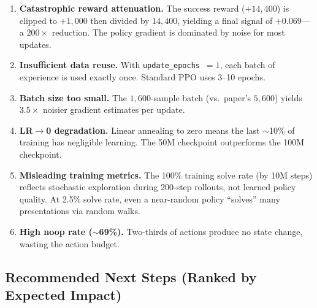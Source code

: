 \documentclass[11pt,a4paper]{article}
\begin{document}
\begin{enumerate}
  \item \textbf{Catastrophic reward attenuation.}  The success reward
    ($+14{,}400$) is clipped to $+1{,}000$ then divided by $14{,}400$, yielding
    a final signal of $+0.069$---a $200\times$ reduction.  The policy gradient
    is dominated by noise for most updates.

  \item \textbf{Insufficient data reuse.}  With \texttt{update\_epochs}~$= 1$,
    each batch of experience is used exactly once.  Standard PPO uses 3--10
    epochs.

  \item \textbf{Batch size too small.}  The $1{,}600$-sample batch (vs.\
    paper's $5{,}600$) yields $3.5\times$ noisier gradient estimates per update.

  \item \textbf{LR$\to$0 degradation.}  Linear annealing to zero means the
    last $\sim$10\% of training has negligible learning.  The 50M checkpoint
    outperforms the 100M checkpoint.

  \item \textbf{Misleading training metrics.}  The 100\% training solve rate
    (by 10M steps) reflects stochastic exploration during 200-step rollouts,
    not learned policy quality.  At 2.5\% solve rate, even a near-random policy
    ``solves'' many presentations via random walks.

  \item \textbf{High noop rate ($\sim$69\%).}  Two-thirds of actions produce no
    state change, wasting the action budget.
\end{enumerate}

\subsection{Recommended Next Steps (Ranked by Expected Impact)}
\end{document}
